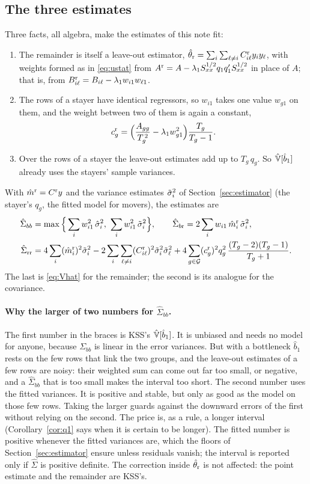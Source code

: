 \subsection{The three estimates}

Three facts, all algebra, make the estimates of this note fit:
\begin{enumerate}
\item The remainder is itself a leave-out estimator, $\hat\theta_{\rm r}=\sum_i\sum_{\ell\ne i}C^{\rm r}_{i\ell}y_iy_\ell$,
with weights formed as in \eqref{eq:ustat} from $A^{\rm r}=A-\lambda_1S_{xx}^{1/2}q_1q_1'S_{xx}^{1/2}$ in place of
$A$; that is, from $B^{\rm r}_{i\ell}=B_{i\ell}-\lambda_1w_{i1}w_{\ell1}$.
\item The rows of a stayer have identical regressors, so $w_{i1}$ takes one value $w_{g1}$ on them, and the
weight between two of them is again a constant,
\[
c_g^{\rm r}=\Big(\frac{A_{gg}}{T_g^{\,2}}-\lambda_1w_{g1}^2\Big)\frac{T_g}{T_g-1}.
\]
\item Over the rows of a stayer the leave-out estimates add up to $T_g\,q_g$. So $\hat{\mathbb{V}}[\hat b_1]$ already uses
the stayers' sample variances.
\end{enumerate}
With $\hat m^{\rm r}=C^{\rm r}y$ and the variance estimates $\tilde\sigma_i^2$ of Section~\ref{sec:estimator} (the stayer's
$q_g$, the fitted model for movers), the estimates are
\begin{align}
\hat\Sigma_{bb}&=\max\Big\{\sum_iw_{i1}^2\,\hat\sigma_i^2,\ \sum_iw_{i1}^2\,\st_i^2\Big\},\qquad
\hat\Sigma_{b{\rm r}}=2\sum_iw_{i1}\,\hat m_i^{\rm r}\,\st_i^2 ,\label{eq:q1est}\\
\hat\Sigma_{\rm rr}&=4\sum_i(\hat m_i^{\rm r})^2\st_i^2-2\sum_i\sum_{\ell\ne i}(C^{\rm r}_{i\ell})^2\st_i^2\st_\ell^2
+4\sum_{g\in\cG}(c_g^{\rm r})^2q_g^2\,\frac{(T_g-2)(T_g-1)}{T_g+1}.\notag
\end{align}
The last is \eqref{eq:Vhat} for the remainder; the second is its analogue for the covariance.

\paragraph{Why the larger of two numbers for $\hat\Sigma_{bb}$.} The first number in the braces is KSS's
$\hat{\mathbb{V}}[\hat b_1]$. It is unbiased and needs no model for anyone, because $\Sigma_{bb}$ is linear in the error
variances. But with a bottleneck $\hat b_1$ rests on the few rows that link the two groups, and the leave-out
estimates of a few rows are noisy: their weighted sum can come out far too small, or negative, and a
$\hat\Sigma_{bb}$ that is too small makes the interval too short. The second number uses the fitted variances. It
is positive and stable, but only as good as the model on those few rows. Taking the larger guards against the
downward errors of the first without relying on the second. The price is, as a rule, a longer interval
(Corollary~\ref{cor:q1} says when it is certain to be longer). The fitted number is positive whenever the fitted
variances are, which the floors of Section~\ref{sec:estimator} ensure unless residuals vanish; the interval is
reported only if $\hat\Sigma$ is positive definite. The correction inside $\hat\theta_{\rm r}$ is not affected:
the point estimate and the remainder are KSS's.

